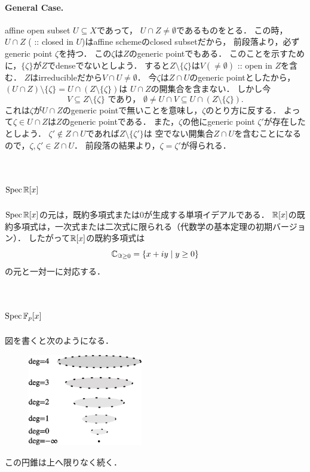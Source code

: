 \documentclass[a4paper]{jsarticle}
\begin{document}
    \paragraph{General Case.}
    affine open subset $U \subseteq X$であって，
    $U \cap Z \neq \emptyset$であるものをとる．
    この時，$U \cap Z$ ( :: closed in $U$)はaffine schemeのclosed subsetだから，
    前段落より，必ずgeneric point $\zeta$を持つ．
    この$\zeta$は$Z$のgeneric pointでもある．
    このことを示すために，$\{\zeta\}$が$Z$でdenseでないとしよう．
    すると$Z \setminus \{\zeta\}$は$V (\neq \emptyset)$ :: open in $Z$を含む．
    $Z$はirreducibleだから$V \cap U \neq \emptyset$．
    今$\zeta$は$Z \cap U$のgeneric pointとしたから，
    $(U \cap Z) \setminus \{\zeta\}=U \cap (Z \setminus \{\zeta\})$は
    $U \cap Z$の開集合を含まない．
    しかし今
    \[
        V \subseteq Z \setminus \{\zeta\}
        \text{ であり， }
        \emptyset \neq U \cap V \subseteq U \cap (Z \setminus \{\zeta\}).
    \]
    これは$\zeta$が$U \cap Z$のgeneric pointで無いことを意味し，$\zeta$のとり方に反する．
    よって$\zeta \in U \cap Z$は$Z$のgeneric pointである．
    また，$\zeta$の他にgeneric point $\zeta'$が存在したとしよう．
    $\zeta' \not \in Z \cap U$であれば$Z \setminus \{\zeta'\}$は
    空でない開集合$Z \cap U$を含むことになるので，$\zeta, \zeta' \in Z \cap U$．
    前段落の結果より，$\zeta=\zeta'$が得られる．

\section{$\operatorname{Spec} \mathbb{R}[x]$} %
    $\operatorname{Spec} \mathbb{R}[x]$の元は，既約多項式または0が生成する単項イデアルである．
    $\mathbb{R}[x]$の既約多項式は，一次式または二次式に限られる（代数学の基本定理の初期バージョン）．
    したがって$\mathbb{R}[x]$の既約多項式は
    \[ \mathbb{C}_{\Im \geq 0}=\{ x+iy \mid y \geq 0 \} \]
    の元と一対一に対応する．

\section{$\operatorname{Spec} \mathbb{F}_p[x]$} %
    図を書くと次のようになる．
    \begin{figure}[ht]
    \begin{center}
        \includegraphics[width=5cm]{./images/SpecF_p[x].eps}
    \end{center}
    \end{figure}
    この円錐は上へ限りなく続く．
\end{document}
